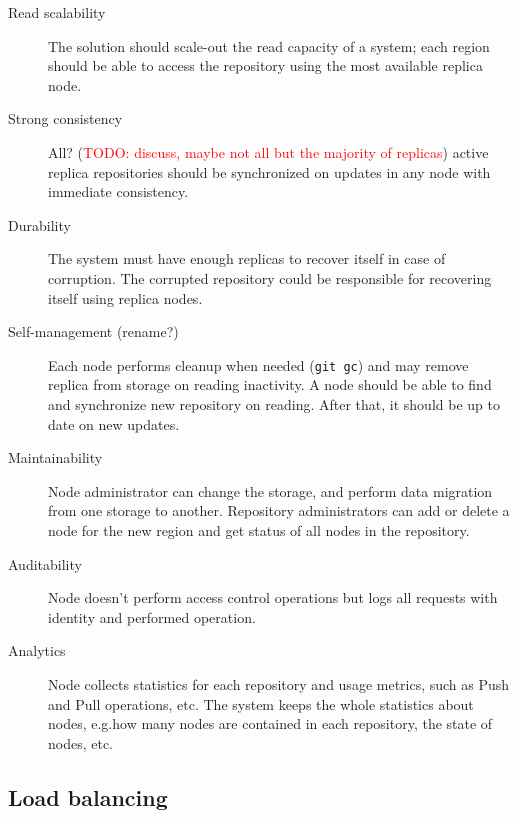 \documentclass[acmlarge, screen, nonacm, 11pt]{acmart}
\newcommand{\code}[1]{\texttt{#1}}
\newcommand{\todo}[1]{\textcolor{red}{TODO: #1}}
\begin{document}
\begin{description}
  \item[Read scalability]
    The solution should scale-out the read capacity of a system; each region should be able
    to access the repository using the most available replica node.
  \item[Strong consistency]
    All? (\todo{discuss, maybe not all but the majority of replicas})
    active replica repositories should be synchronized on updates in any node
    with immediate consistency.
  \item[Durability]
    The system must have enough replicas to recover itself in case of corruption.
    The corrupted repository could be responsible for recovering itself using replica nodes.
  \item[Self-management (rename?)]
    Each node performs cleanup when needed (\code{git gc}) and may remove replica
    from storage on reading inactivity.
    A node should be able to find and synchronize new repository on reading. After that, it should be up to date on new updates.
  \item[Maintainability]
    Node administrator can change the storage, and perform data migration from one storage
    to another.
    Repository administrators can add or delete a node for the new region and
    get status of all nodes in the repository.
  \item[Auditability]
    Node doesn't perform access control operations but logs all
    requests with identity and performed operation.
  \item[Analytics]
    Node collects statistics for each repository and usage metrics, such as
    Push and Pull operations, etc. The system keeps the whole statistics about
    nodes, e.g.\@ how many nodes are contained in each repository, the state of nodes, etc.
\end{description}

\subsection{Load balancing}\label{sec:load-balancing}
\end{document}
